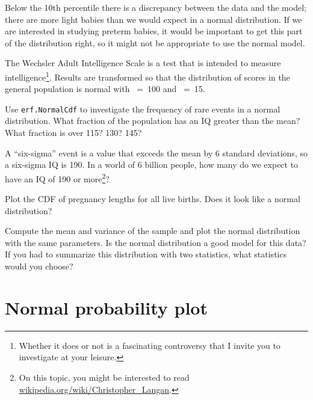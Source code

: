 \documentclass[12pt]{book}
\begin{document}
Below the 10th percentile there is a discrepancy between the data
and the model; there are more light babies than we would expect in
a normal distribution.  If we are interested in studying preterm
babies, it would be important to get this part of the distribution
right, so it might not be appropriate to use the normal
model.

\begin{exercise}
The Wechsler Adult Intelligence Scale is a test that is intended
to measure intelligence\footnote{Whether it does or not is a
fascinating controversy that I invite you to investigate at your
leisure.}.  Results are transformed so that the distribution of scores
in the general population is normal with \mymu~=~100 and \mysigma~=~15.

Use {\tt erf.NormalCdf} to investigate the frequency of rare events in
a normal distribution.  What fraction of the population has an IQ
greater than the mean?  What fraction is over 115?  130?  145?

A ``six-sigma'' event is a value that exceeds the mean by 6 standard
deviations, so a six-sigma IQ is 190.  In a world of 6 billion people,
how many do we expect to have an IQ of 190 or more\footnote{On this
  topic, you might be interested to read
  \url{wikipedia.org/wiki/Christopher_Langan}.}?

\end{exercise}


\begin{exercise}
Plot the CDF of pregnancy lengths for all live births.  Does it
look like a normal distribution?

Compute the mean and variance of the sample and plot the normal
distribution with the same parameters.  Is the normal distribution a
good model for this data?  If you had to summarize this distribution
with two statistics, what statistics would you choose?

\end{exercise}


\section{Normal probability plot}
\end{document}
